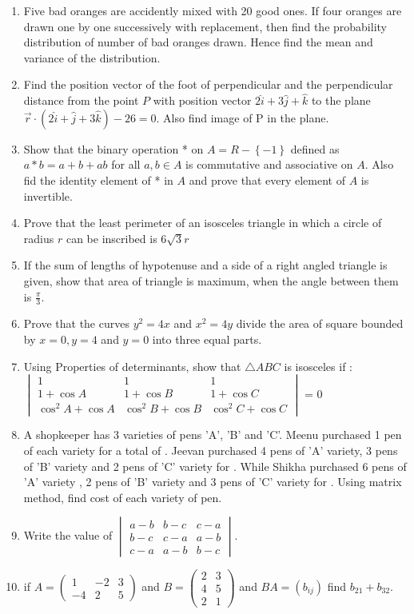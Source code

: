 \documentclass[journal,12pt,onecolumn]{IEEEtran}
\theoremstyle{remark}
\providecommand{\brak}[1]{\ensuremath{\left(#1\right)}}
\providecommand{\cbrak}[1]{\ensuremath{\left\{#1\right\}}}
\newcommand{\myvec}[1]{\ensuremath{\begin{pmatrix}#1\end{pmatrix}}}
\newcommand{\mydet}[1]{\ensuremath{\begin{vmatrix}#1\end{vmatrix}}}
\begin{document}
\begin{enumerate}
    \item Five bad oranges are accidently mixed with 20 good ones. If four oranges are drawn one by one successively with replacement, then find the probability distribution of number of bad oranges drawn. Hence find the mean and variance of the distribution.
    \item Find the position vector of the foot of perpendicular and the perpendicular distance from the point $P$ with position vector $2\hat{i}+3\hat{j}+\hat{k}$ to the plane $\vec{r}\cdot\brak{2\hat{i}+\hat{j}+3\hat{k}} - 26=0$. Also find image of P in the plane.
    \item Show that the binary operation * on $ A=R -\cbrak{-1}$ defined as $a*b= a+b+ab$ for all $a,b \in A$ is commutative and associative on $A$. Also fid the identity element of * in $A$ and prove that every element of $A$ is invertible.
    \item Prove that the least perimeter of an isosceles triangle in which a circle of radius $r$ can be inscribed is $6 \sqrt{3} r$
    \item If the sum of lengths of hypotenuse and a side of a right angled triangle is given, show that area of triangle is maximum, when the angle between them is $\frac{\pi}{3}$.
    \item Prove that the curves $y^2=4x$ and $x^2= 4y$ divide the area of square bounded by $x=0,y=4$ and $y=0$ into three equal parts.
    \item Using Properties of determinants, show that $\triangle ABC$ is isosceles if :\\
          \mydet{
              1&1&1\\
              1+\cos A & 1+ \cos B & 1+ \cos C\\
              \cos^2 A + \cos A & \cos^2 B + \cos B & \cos^2 C + \cos C
          } = 0
    \item A shopkeeper has 3 varieties of pens 'A', 'B' and 'C'. Meenu purchased 1 pen of each variety for a total of . Jeevan purchased 4 pens of 'A' variety, 3 pens of 'B' variety and 2 pens of 'C' variety for . While Shikha purchased 6 pens of 'A' variety , 2 pens of 'B' variety and 3 pens of 'C' variety for . Using matrix method, find cost of each variety of pen.
    \item Write the value of
          \mydet{a-b & b-c & c-a \\
              b-c & c-a & a-b\\
              c-a & a-b & b-c
          }.
    \item if $A=\myvec{1&-2&3\\-4&2&5}$ and $B=\myvec{2&3\\4&5\\2&1}$ and $BA=\brak{b_{ij}}$ find $b_{21} + b_{32}$.

\end{enumerate}
\end{document}
